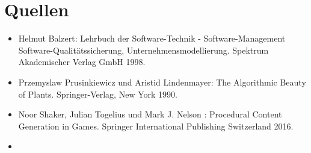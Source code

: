 \slidetitle{}
\section{Quellen}

\begin{itemize}

\item Helmut Balzert: Lehrbuch der Software-Technik - Software-Management Software-Qualitätssicherung, Unternehmensmodellierung. Spektrum Akademischer Verlag GmbH 1998.

\item Przemyslaw Prusinkiewicz und Aristid Lindenmayer: The Algorithmic Beauty of Plants. Springer-Verlag, New York 1990.

\item Noor Shaker, Julian Togelius und Mark J. Nelson : Procedural Content Generation in Games. Springer International Publishing Switzerland 2016.

\item 
\end{itemize}